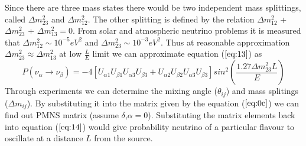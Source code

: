 \documentclass[12pt,a4paper]{report}
\begin{document}
Since there are three mass states there would be two independent mass splittings, called $\Delta m_{23}^{2}$ and $\Delta m_{12}^{2}$. The other splitting is defined by the relation $\Delta m_{12}^{2}$ + $\Delta m_{23}^{2}$ + $\Delta m_{13}^{2}=0$. From solar and atmospheric neutrino problems it is measured that $\Delta m_{12}^{2}\sim 10^{-5} eV^{2}$ and $\Delta m_{23}^{2} \sim 10^{-3}eV^{2}$. Thus at reasonable approximation $\Delta m_{23}^{2} \approx \Delta m_{13}^{2}$ at low $\frac{L}{E}$ limit we can approximate equation ($\ref{eq:13}$) as
\begin{equation}
\label{eq:14}
P(\nu_{\alpha} \rightarrow \nu_{\beta} ) =-4 [ U_{\alpha 1} U_{\beta 1} U_{\alpha 3} U_{\beta 3} + U_{\alpha 2} U_{\beta 2} U_{\alpha 3} U_{\beta 3}]sin^{2}( \frac{1.27\Delta m_{23}^{2} L}{E})
\end{equation}
Through experiments we can determine the mixing angle ($ \theta_{ij}$) and mass splitings ($\Delta m_{ij}$). By substituting it into the matrix given by the equation ($\ref{eq:0c}$) we can find out PMNS matrix (assume $\delta$,$\alpha=0$). Substituting the matrix elements back into equation ($\ref{eq:14}$) would give probability neutrino of a particular flavour to oscillate at a distance $L$ from the source.
\newpage
\thispagestyle{empty}
\mbox{}
\newpage
\end{document}
